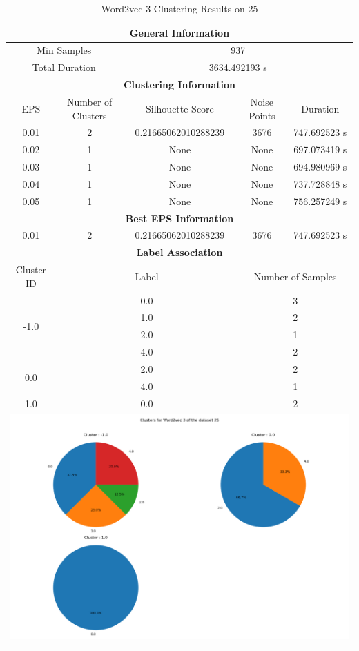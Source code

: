 \begin{longtable}{|c|c|c|c|c|}
\caption{Word2vec 3 Clustering Results on 25} \label{tab:25_word2vec_3_clustering_results}\\
\hline
\multicolumn{5}{|c|}{\textbf{General Information}} \\
\hline
\multicolumn{2}{|c|}{Min Samples} & \multicolumn{3}{c|}{937} \\
\multicolumn{2}{|c|}{Total Duration} & \multicolumn{3}{c|}{3634.492193 s} \\
\hline
\multicolumn{5}{|c|}{\textbf{Clustering Information}} \\
\hline
EPS & Number of Clusters & Silhouette Score & Noise Points & Duration \\
0.01 & 2 & 0.21665062010288239 & 3676 & 747.692523 s\\
0.02 & 1 & None & None & 697.073419 s\\
0.03 & 1 & None & None & 694.980969 s\\
0.04 & 1 & None & None & 737.728848 s\\
0.05 & 1 & None & None & 756.257249 s\\
\hline
\multicolumn{5}{|c|}{\textbf{Best EPS Information}} \\
\hline
0.01 & 2 & 0.21665062010288239 & 3676 & 747.692523 s\\
\hline
\multicolumn{5}{|c|}{\textbf{Label Association}} \\
\hline
Cluster ID & \multicolumn{2}{c|}{Label} & \multicolumn{2}{c|}{Number of Samples} \\
\hline
\multirow{4}{*}{-1.0} & \multicolumn{2}{c|}{0.0} & \multicolumn{2}{c|}{3} \\
& \multicolumn{2}{c|}{1.0} & \multicolumn{2}{c|}{2} \\
& \multicolumn{2}{c|}{2.0} & \multicolumn{2}{c|}{1} \\
& \multicolumn{2}{c|}{4.0} & \multicolumn{2}{c|}{2} \\
\hline
\multirow{2}{*}{0.0} & \multicolumn{2}{c|}{2.0} & \multicolumn{2}{c|}{2} \\
& \multicolumn{2}{c|}{4.0} & \multicolumn{2}{c|}{1} \\
\hline
\multirow{1}{*}{1.0} & \multicolumn{2}{c|}{0.0} & \multicolumn{2}{c|}{2} \\
\hline
\multicolumn{5}{|c|}{\includegraphics[width=0.8\linewidth]{img/annexes/25/clustering_pie_charts/Word2vec 3.png}} \\
\end{longtable}


